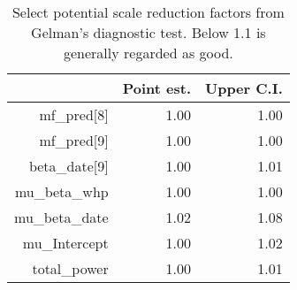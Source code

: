 \begin{table}[]
\centering
\begin{tabular}{rrr}
  \hline
 & Point est. & Upper C.I. \\ 
  \hline
mf\_pred[8] & 1.00 & 1.00 \\ 
  mf\_pred[9] & 1.00 & 1.00 \\ 
  beta\_date[9] & 1.00 & 1.01 \\ 
  mu\_beta\_whp & 1.00 & 1.00 \\ 
  mu\_beta\_date & 1.02 & 1.08 \\ 
  mu\_Intercept & 1.00 & 1.02 \\ 
  total\_power & 1.00 & 1.01 \\ 
   \hline
\end{tabular}
\caption{Select potential scale reduction factors from Gelman's diagnostic test. Below 1.1 is generally regarded as good.} 
\label{tab:gelman}
\end{table}
